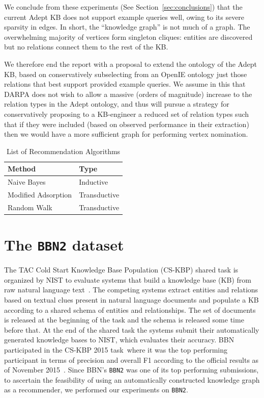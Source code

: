 \documentclass[paper=a4,fontsize=11pt]{scrartcl}
\newcommand{\Secref}[1]{Section~\ref{#1}}
\numberwithin{equation}{section}    %
\numberwithin{figure}{section}      %
\numberwithin{table}{section}       %
\newcommand{\dataset}[0]{\texttt{BBN2} dataset\ }
\newcommand{\task}{CS-KBP 2015 task\ }
\begin{document}
We conclude from these experiments (See \Secref{sec:conclusions})
that the current Adept KB does not
support example queries well, owing to its severe sparsity
in edges. In short, the ``knowledge graph'' is not much of a graph. The
overwhelming majority of vertices form singleton cliques: entities are
discovered but no relations connect them to the rest of the KB.

We therefore end the report with a proposal to extend the ontology of
the Adept KB, based on conservatively subselecting from an OpenIE
ontology just those relations that best support provided example
queries. We assume in this that DARPA does not wish to allow a
massive (orders of magnitude) increase to the relation types in the
Adept ontology, and thus will pursue a strategy for conservatively
proposing to a KB-engineer a reduced set of relation types such that
if they were included (based on observed performance in their
extraction) then we would have a more sufficient graph for performing
vertex nomination.
\begin{table}[htbp]
  \centering
  \begin{tabular}{l l}
    Method              & Type         \\\hline
    Naive Bayes         & Inductive    \\
    Modified Adsorption & Transductive \\
    Random Walk         & Transductive \\
  \end{tabular}
  \caption{List of Recommendation Algorithms}
  \label{tab:ra}
\end{table}

\section{The \dataset{}}
\label{sec:data}
The TAC Cold Start Knowledge Base Population (CS-KBP) shared task is organized
by NIST to evaluate systems that build a knowledge base (KB) from raw natural
language text~\citep{tac2015cold}. The competing systems extract entities and relations based on
textual clues present in natural language documents and populate a KB according to a shared
schema of entities and relationships. The set of documents is released at the beginning of
the task and the schema is released some time before that.
At the end of the shared task the systems submit their
automatically generated knowledge bases to NIST, which evaluates their accuracy.
BBN participated in the \task where it was the top performing
participant in terms of precision and overall F1 according to the official
results as of November 2015~\citep{bbn2015bonan}. Since BBN's \texttt{BBN2} was one
of its top performing submissions, to ascertain the feasibility of using an
automatically constructed knowledge graph as a recommender, we
performed our experiments on \texttt{BBN2}.
\end{document}

